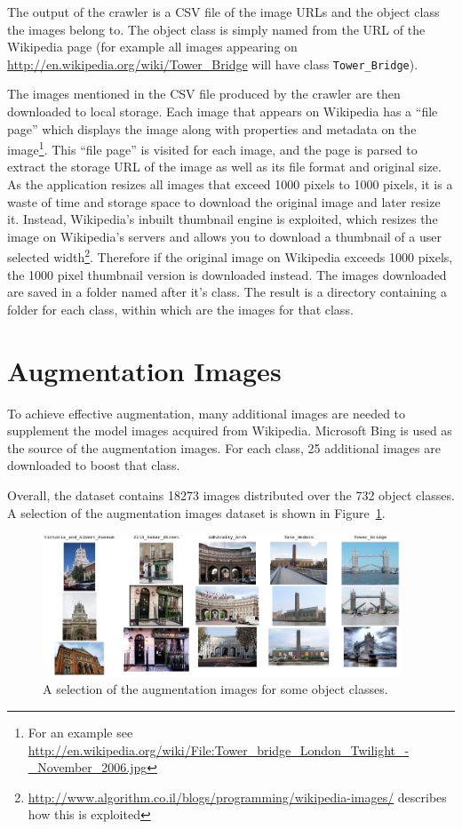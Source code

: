 \documentclass[11pt, onecolumn, a4paper, final]{report} %
\begin{document}
The output of the crawler is a CSV file of the image URLs and the object class the images belong to. The object class is simply named from the URL of the Wikipedia page (for example all images appearing on \url{http://en.wikipedia.org/wiki/Tower_Bridge} will have class \lstinline!Tower_Bridge!).

The images mentioned in the CSV file produced by the crawler are then downloaded to local storage. Each image that appears on Wikipedia has a ``file page'' which displays the image along with properties and metadata on the image\footnote{For an example see \url{http://en.wikipedia.org/wiki/File:Tower_bridge_London_Twilight_-_November_2006.jpg}}. This ``file page'' is visited for each image, and the page is parsed to extract the storage URL of the image as well as its file format and original size. As the application resizes all images that exceed 1000 pixels to 1000 pixels, it is a waste of time and storage space to download the original image and later resize it. Instead, Wikipedia's inbuilt thumbnail engine is exploited, which resizes the image on Wikipedia's servers and allows you to download a thumbnail of a user selected width\footnote{\url{http://www.algorithm.co.il/blogs/programming/wikipedia-images/} describes how this is exploited}. Therefore if the original image on Wikipedia exceeds 1000 pixels, the 1000 pixel thumbnail version is downloaded instead. The images downloaded are saved in a folder named after it's class. The result is a directory containing a folder for each class, within which are the images for that class.


\section{Augmentation Images}
\label{sec:turboimages}
To achieve effective augmentation, many additional images are needed to supplement the model images acquired from Wikipedia. Microsoft Bing is used as the source of the augmentation images. For each class, 25 additional images are downloaded to boost that class.

Overall, the dataset contains 18273 images distributed over the 732 object classes. A selection of the augmentation images dataset is shown in Figure~\ref{fig:augimages}.

\begin{figure}[!h]
\centering
\includegraphics[width=0.95\textwidth]{images/augmentationimages.png}
\caption{A selection of the augmentation images for some object classes.}
\label{fig:augimages}
\end{figure}
\end{document}
